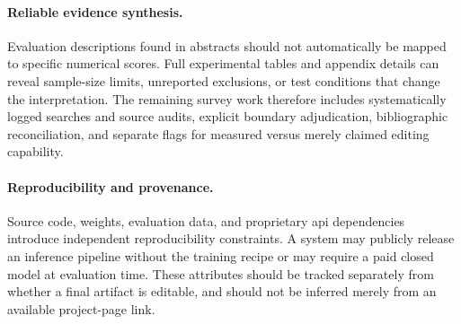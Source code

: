 \paragraph{Reliable evidence synthesis.}
Evaluation descriptions found in abstracts should not automatically be mapped to specific numerical scores.
Full experimental tables and appendix details can reveal sample-size limits, unreported exclusions, or test conditions that change the interpretation.
The remaining survey work therefore includes systematically logged searches and source audits, explicit boundary adjudication, bibliographic reconciliation, and separate flags for measured versus merely claimed editing capability.

\paragraph{Reproducibility and provenance.}
Source code, weights, evaluation data, and proprietary \ac{api} dependencies introduce independent reproducibility constraints.
A system may publicly release an inference pipeline without the training recipe or may require a paid closed model at evaluation time.
These attributes should be tracked separately from whether a final artifact is editable, and should not be inferred merely from an available project-page link.
